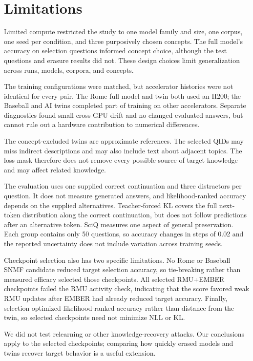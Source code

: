 \section{Limitations}
\label{sec:limitations}

Limited compute restricted the study to one model family and size, one corpus,
one seed per condition, and three purposively chosen concepts. The full
model's accuracy on selection questions informed concept choice, although the
test questions and erasure results did not. These design choices limit
generalization across runs, models, corpora, and concepts.

The training configurations were matched, but accelerator histories were not
identical for every pair. The Rome full model and twin both used an H200; the
Baseball and AI twins completed part of training on other accelerators.
Separate diagnostics found small cross-GPU drift and no changed evaluated
answers, but cannot rule out a hardware contribution to numerical differences.

The concept-excluded twins are approximate references. The selected QIDs may
miss indirect descriptions and may also include text about adjacent topics.
The loss mask therefore does not remove every possible source of target
knowledge and may affect related knowledge.

The evaluation uses one supplied correct continuation and three distractors
per question. It does not measure generated answers, and likelihood-ranked
accuracy depends on the supplied alternatives. Teacher-forced KL covers the
full next-token distribution along the correct continuation, but does not
follow predictions after an alternative token. SciQ measures one aspect of
general preservation. Each group contains only 50 questions, so accuracy
changes in steps of 0.02 and the reported uncertainty does not include
variation across training seeds.

Checkpoint selection also has two specific limitations. No Rome or Baseball
SNMF candidate reduced target selection accuracy, so tie-breaking rather than
measured efficacy selected those checkpoints. All selected RMU+EMBER
checkpoints failed the RMU activity check, indicating that the score favored
weak RMU updates after EMBER had already reduced target accuracy. Finally,
selection optimized likelihood-ranked accuracy rather than distance from the
twin, so selected checkpoints need not minimize NLL or KL.

We did not test relearning or other knowledge-recovery attacks. Our conclusions
apply to the selected checkpoints; comparing how quickly erased models and
twins recover target behavior is a useful extension.
